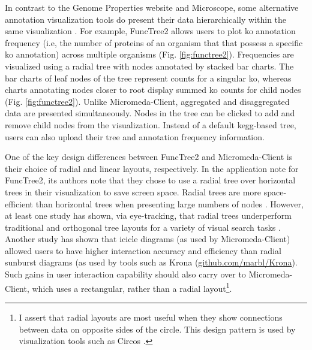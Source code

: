 In contrast to the Genome Properties website and Microscope, some alternative 
annotation visualization tools do present their data hierarchically within the 
same visualization \cite{darzi2019functree2}. For example, FuncTree2 
\cite{darzi2019functree2} allows users to plot \gls{ko}  annotation 
\cite{mao2005automated,kanehisa2011kegg} frequency (i.e, the number of proteins 
of an organism that that possess a specific \gls{ko}  annotation) across 
multiple organisms (Fig. \ref{fig:functree2}). Frequencies are visualized using 
a radial tree with nodes annotated by stacked bar charts. The bar charts of leaf 
nodes of the tree represent counts for a singular \gls{ko}, whereas charts 
annotating nodes closer to root display summed \gls{ko}  counts for child nodes 
(Fig. \ref{fig:functree2}). Unlike Micromeda-Client, aggregated and 
disaggregated data are presented simultaneously. Nodes in the tree can be clicked 
to add and remove child nodes from the visualization. Instead of a default 
\gls{kegg}-based tree, users can also upload their tree and annotation frequency 
information.

One of the key design differences between FuncTree2 and Micromeda-Client is 
their choice of radial and linear layouts, respectively. In the application note 
for FuncTree2, its authors note that they chose to use a radial tree over 
horizontal trees in their visualization to save screen space. Radial trees are 
more space-efficient than horizontal trees when presenting large numbers of 
nodes \cite{burch2011evaluation}. However, at least one study has shown, via 
eye-tracking, that radial trees underperform traditional and orthogonal tree 
layouts for a variety of visual search tasks \cite{burch2011evaluation}. Another 
study has shown that icicle diagrams (as used by Micromeda-Client) allowed users 
to have higher interaction accuracy and efficiency \cite{muramalla2017radial} 
than radial sunburst diagrams (as used by tools such as Krona 
\cite{ondov2011interactive} 
(\href{http://github.com/marbl/Krona}{github.com/marbl/Krona}).
Such gains in user interaction capability should also carry over to 
Micromeda-Client, which uses a rectangular, rather than a radial 
layout\footnote{I assert that radial layouts are most useful when they show 
connections between data on opposite sides of the circle. This design pattern is 
used by visualization tools such as Circos \cite{krzywinski2009circos}.}.

